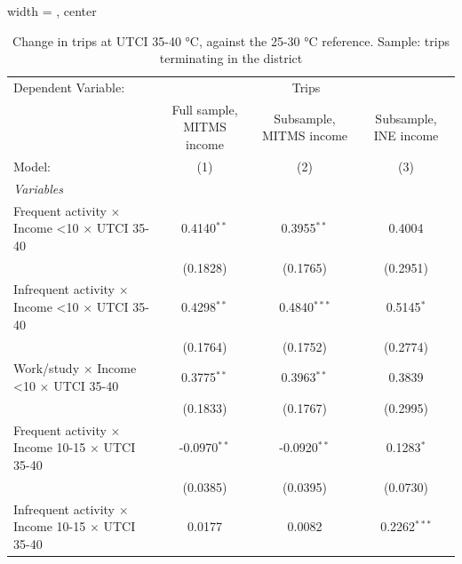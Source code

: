 
\begin{table}[htbp]
   \caption{\label{table_models_abc_terminating_35-40} Change in trips at UTCI 35-40 °C, against the 25-30 °C reference. Sample: trips terminating in the district}
   \centering
   \small
   \begin{adjustbox}{width = \textwidth, center}
      \begin{tabular}{lccc}
         \tabularnewline \midrule \midrule
         Dependent Variable: & \multicolumn{3}{c}{Trips}\\
                                                                         & Full sample, MITMS income & Subsample, MITMS income & Subsample, INE income \\   
         Model:                                                          & (1)                       & (2)                     & (3)\\  
         \midrule
         \emph{Variables}\\
         Frequent activity $\times$ Income <10 $\times$ UTCI 35-40       & 0.4140$^{**}$             & 0.3955$^{**}$           & 0.4004\\   
                                                                         & (0.1828)                  & (0.1765)                & (0.2951)\\   
         Infrequent activity $\times$ Income <10 $\times$ UTCI 35-40     & 0.4298$^{**}$             & 0.4840$^{***}$          & 0.5145$^{*}$\\   
                                                                         & (0.1764)                  & (0.1752)                & (0.2774)\\   
         Work/study $\times$ Income <10 $\times$ UTCI 35-40              & 0.3775$^{**}$             & 0.3963$^{**}$           & 0.3839\\   
                                                                         & (0.1833)                  & (0.1767)                & (0.2995)\\   
         Frequent activity $\times$ Income 10-15 $\times$ UTCI 35-40     & -0.0970$^{**}$            & -0.0920$^{**}$          & 0.1283$^{*}$\\   
                                                                         & (0.0385)                  & (0.0395)                & (0.0730)\\   
         Infrequent activity $\times$ Income 10-15 $\times$ UTCI 35-40   & 0.0177                    & 0.0082                  & 0.2262$^{***}$\\   

\end{tabular}
\end{adjustbox}
\end{table}
